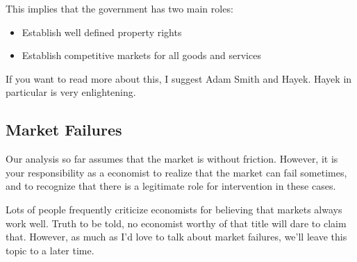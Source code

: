 \documentclass[11pt]{scrartcl}
\begin{document}
This implies that the government has two main roles:

\begin{itemize}
\item Establish well defined property rights
\item Establish competitive markets for all goods and services
\end{itemize}

If you want to read more about this, I suggest Adam Smith and Hayek. Hayek in particular is very enlightening. 

\subsection{Market Failures}

Our analysis so far assumes that the market is without friction. However, it is your responsibility as a economist to realize that the market can fail sometimes, and to recognize that there is a legitimate role for intervention in these cases. 

Lots of people frequently criticize economists for believing that markets always work well. Truth to be told, no economist worthy of that title will dare to claim that. However, as much as I'd love to talk about market failures, we'll leave this topic to a later time. 
\end{document}
